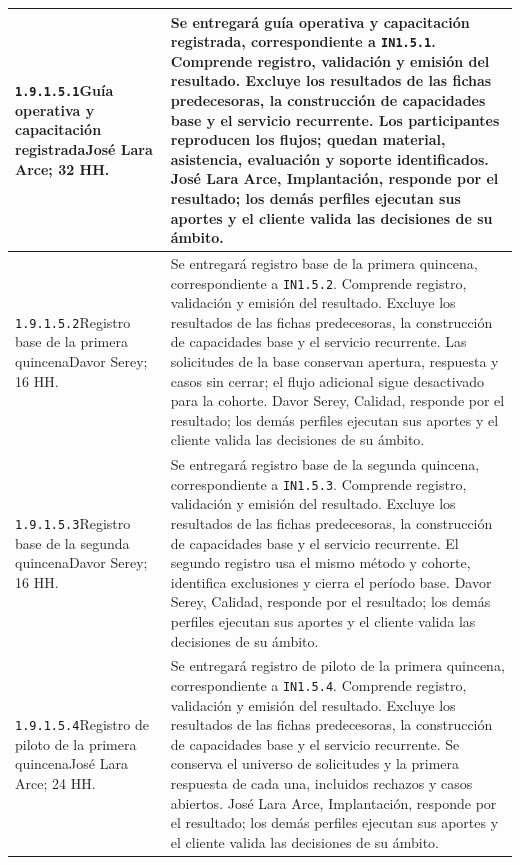 \begin{longtable}{L{52mm}L{91mm}}
\texttt{1.\allowbreak{}9.\allowbreak{}1.\allowbreak{}5.\allowbreak{}1}\newline Guía operativa y capacitación registrada\newline José Lara Arce; 32 HH. & Se entregará guía operativa y capacitación registrada, correspondiente a \texttt{IN1.5.1}. Comprende registro, validación y emisión del resultado. Excluye los resultados de las fichas predecesoras, la construcción de capacidades base y el servicio recurrente.  Los participantes reproducen los flujos; quedan material, asistencia, evaluación y soporte identificados. José Lara Arce, Implantación, responde por el resultado; los demás perfiles ejecutan sus aportes y el cliente valida las decisiones de su ámbito.\\\hline
\texttt{1.\allowbreak{}9.\allowbreak{}1.\allowbreak{}5.\allowbreak{}2}\newline Registro base de la primera quincena\newline Davor Serey; 16 HH. & Se entregará registro base de la primera quincena, correspondiente a \texttt{IN1.5.2}. Comprende registro, validación y emisión del resultado. Excluye los resultados de las fichas predecesoras, la construcción de capacidades base y el servicio recurrente.  Las solicitudes de la base conservan apertura, respuesta y casos sin cerrar; el flujo adicional sigue desactivado para la cohorte. Davor Serey, Calidad, responde por el resultado; los demás perfiles ejecutan sus aportes y el cliente valida las decisiones de su ámbito.\\\hline
\texttt{1.\allowbreak{}9.\allowbreak{}1.\allowbreak{}5.\allowbreak{}3}\newline Registro base de la segunda quincena\newline Davor Serey; 16 HH. & Se entregará registro base de la segunda quincena, correspondiente a \texttt{IN1.5.3}. Comprende registro, validación y emisión del resultado. Excluye los resultados de las fichas predecesoras, la construcción de capacidades base y el servicio recurrente.  El segundo registro usa el mismo método y cohorte, identifica exclusiones y cierra el período base. Davor Serey, Calidad, responde por el resultado; los demás perfiles ejecutan sus aportes y el cliente valida las decisiones de su ámbito.\\\hline
\texttt{1.\allowbreak{}9.\allowbreak{}1.\allowbreak{}5.\allowbreak{}4}\newline Registro de piloto de la primera quincena\newline José Lara Arce; 24 HH. & Se entregará registro de piloto de la primera quincena, correspondiente a \texttt{IN1.5.4}. Comprende registro, validación y emisión del resultado. Excluye los resultados de las fichas predecesoras, la construcción de capacidades base y el servicio recurrente.  Se conserva el universo de solicitudes y la primera respuesta de cada una, incluidos rechazos y casos abiertos. José Lara Arce, Implantación, responde por el resultado; los demás perfiles ejecutan sus aportes y el cliente valida las decisiones de su ámbito.\\\hline

\end{longtable}
